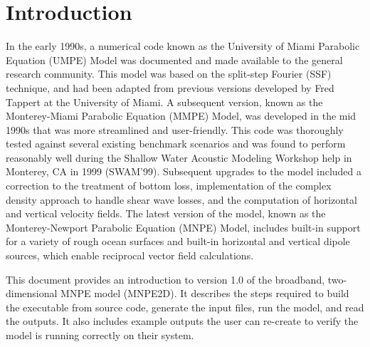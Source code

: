 \section{Introduction}

In the early 1990s, a numerical code known as the University of Miami Parabolic Equation (UMPE) Model was documented and made available to the general research community\cite{Smith1993}. This model was based on the split-step Fourier (SSF) technique\cite{Hardin1973}, and had been adapted from previous versions developed by Fred Tappert at the University of Miami. A subsequent version, known as the Monterey-Miami Parabolic Equation (MMPE) Model, was developed in the mid 1990s that was more streamlined and user-friendly. This code was thoroughly tested against several existing benchmark scenarios and was found to perform reasonably well during the Shallow Water Acoustic Modeling Workshop help in Monterey, CA in 1999 (SWAM'99)\cite{Smith2001}. Subsequent upgrades to the model included a correction to the treatment of bottom loss\cite{Smith2007}, implementation of the complex density approach to handle shear wave losses\cite{Zhang1995}, and the computation of horizontal and vertical velocity fields\cite{Smith2008}. The latest version of the model, known as the Monterey-Newport Parabolic Equation (MNPE) Model, includes built-in support for a variety of rough ocean surfaces\cite{Tappert} and built-in horizontal and vertical dipole sources, which enable reciprocal vector field calculations\cite{Deal2017}.

This document provides an introduction to version 1.0 of the broadband, two-dimensional MNPE model (MNPE2D). It describes the steps required to build the executable from source code, generate the input files, run the model, and read the outputs. It also includes example outputs the user can re-create to verify the model is running correctly on their system.
